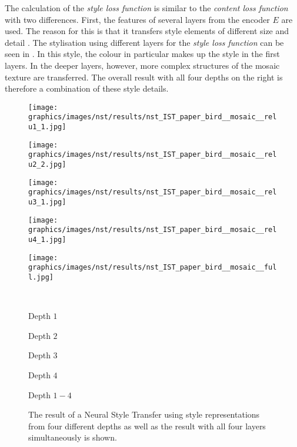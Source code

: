 The calculation of the \emph{style loss function} \styleloss{} is similar to the \emph{content loss function} \contentloss{} with two differences. First, the features of several layers from the encoder $E$ are used. The reason for this is that it transfers style elements of different size and detail \cite{Glas2021}. The stylisation using different layers for the \emph{style loss function} \styleloss{} can be seen in . In this style, the colour in particular makes up the style in the first layers. In the deeper layers, however, more complex structures of the mosaic texture are transferred. The overall result with all four depths on the right is therefore a combination of these style details.
\begin{figure}
	\centering
	\begin{minipage}{.2\textwidth}
		\centering
		\texttt{[image: graphics/images/nst/results/nst\_IST\_paper\_bird\_\_mosaic\_\_relu1\_1.jpg]}
	\end{minipage}%
	\begin{minipage}{.2\textwidth}
		\centering
		\texttt{[image: graphics/images/nst/results/nst\_IST\_paper\_bird\_\_mosaic\_\_relu2\_2.jpg]}
	\end{minipage}%
	\begin{minipage}{.2\textwidth}
		\centering
		\texttt{[image: graphics/images/nst/results/nst\_IST\_paper\_bird\_\_mosaic\_\_relu3\_1.jpg]}
	\end{minipage}%
	\begin{minipage}{.2\textwidth}
		\centering
		\texttt{[image: graphics/images/nst/results/nst\_IST\_paper\_bird\_\_mosaic\_\_relu4\_1.jpg]}
	\end{minipage}%
	\begin{minipage}{.2\textwidth}
	\centering
	\texttt{[image: graphics/images/nst/results/nst\_IST\_paper\_bird\_\_mosaic\_\_full.jpg]}
	\end{minipage}\\ \vspace{0.15cm}
	\begin{minipage}{.2\textwidth}
		\centering
		Depth $1$
	\end{minipage}%
	\begin{minipage}{.2\textwidth}
		\centering
		Depth $2$
	\end{minipage}%
	\begin{minipage}{.2\textwidth}
		\centering
		Depth $3$
	\end{minipage}%
	\begin{minipage}{.2\textwidth}
		\centering
		Depth $4$
	\end{minipage}%
	\begin{minipage}{.2\textwidth}
		\centering
		Depth $1-4$
	\end{minipage}%
	\caption{The result of a Neural Style Transfer using style representations from four different depths as well as the result with all four layers simultaneously is shown.}
	\label{fig:diff_depth_nst}
\end{figure}

